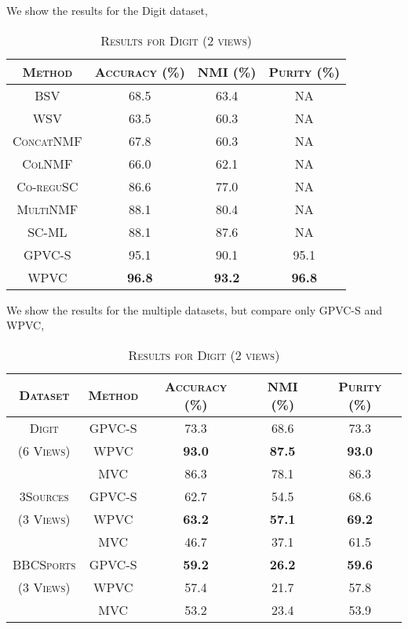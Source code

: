 \documentclass[a4paper]{article}
\begin{document}
	We show the results for the Digit dataset,	
	\begin{table}[h!]
	  \begin{center}
	    \begin{tabular}{c|c|c|c}
	      \toprule
	      \textsc{Method} & \textsc{Accuracy (\%) } & \textsc{NMI (\%) } 
	      & \textsc{Purity (\%)} 	\\
            
		  \midrule
			\textsc{BSV} & 68.5 & 63.4 & NA\\
			\textsc{WSV} & 63.5 & 60.3 & NA\\
			\textsc{ConcatNMF} & 67.8 & 60.3 & NA\\
			\textsc{ColNMF} & 66.0 & 62.1 & NA\\
			\textsc{Co-reguSC} & 86.6 & 77.0 & NA\\
			\textsc{MultiNMF} & 88.1 & 80.4 & NA\\
			\textsc{SC-ML} & 88.1 & 87.6 & NA\\
			\textsc{GPVC-S} & 95.1 & 90.1 & 95.1\\  
			\textsc{WPVC} & \textbf{96.8} & \textbf{93.2} & \textbf{96.8}\\
		  
		  \bottomrule
	    \end{tabular}
	    \caption*{\textsc{Results for Digit (2 views)}}
	  \end{center}
	\end{table}		

	We show the results for the multiple datasets, but compare only GPVC-S and WPVC,	
	\begin{table}[h!]
	  \begin{center}
	    \begin{tabular}{c|c|c|c|c}
	      \toprule
		  \textsc{Dataset} & \textsc{Method} & \textsc{Accuracy (\%) } & \textsc{NMI (\%) } 
	      & \textsc{Purity (\%)} 	\\
            
		  \midrule
			\textsc{Digit} & \textsc{GPVC-S} & 73.3 & 68.6 & 73.3\\  
			\footnotesize\textsc{(6 Views)} & \textsc{WPVC} & \textbf{93.0} & \textbf{87.5} & \textbf{93.0}\\
			& \textsc{MVC} & 86.3 & 78.1 & 86.3\\  
		  \midrule
	    	\textsc{3Sources} & \textsc{GPVC-S} & 62.7 & 54.5 & 68.6\\  
			\footnotesize\textsc{(3 Views)} & \textsc{WPVC} & \textbf{63.2} & \textbf{57.1} & \textbf{69.2}\\
			& \textsc{MVC} & 46.7 & 37.1 & 61.5\\  
		  \midrule
	    	\textsc{BBCSports} & \textsc{GPVC-S} & \textbf{59.2} & \textbf{26.2} & \textbf{59.6}\\  
			\footnotesize\textsc{(3 Views)} & \textsc{WPVC} & {57.4} & {21.7} & {57.8}\\
			& \textsc{MVC} & 53.2 & 23.4 & 53.9\\  
		  \midrule

	    \end{tabular}
	    \caption*{\textsc{Results for Digit (2 views)}}
	  \end{center}
	\end{table}		
\end{document}
